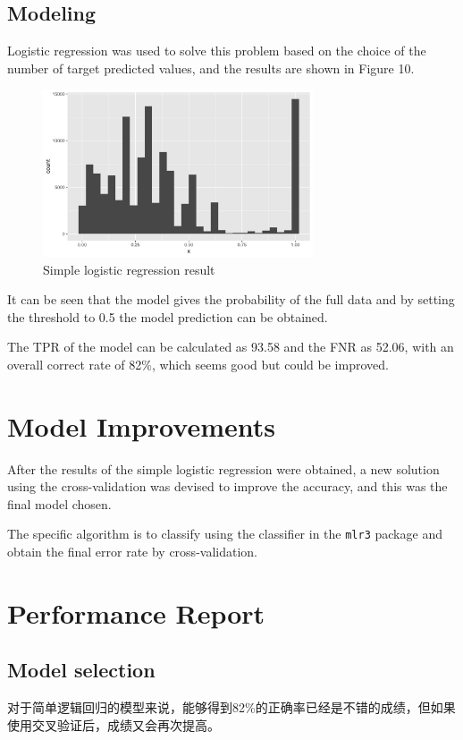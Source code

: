 \documentclass{article}
\begin{document}
\subsection{Modeling}

Logistic regression was used to solve this problem based on the choice of the number of target predicted values, and the results are shown in Figure 10.

\begin{figure}[h]
\centering
\includegraphics[width=8cm]{lrresult.png} %
\caption{Simple logistic regression result} %
\end{figure}

It can be seen that the model gives the probability of the full data and by setting the threshold to 0.5 the model prediction can be obtained.

The TPR of the model can be calculated as 93.58 and the FNR as 52.06, with an overall correct rate of 82\%, which seems good but could be improved.


\section{Model Improvements}

After the results of the simple logistic regression were obtained, a new solution using the cross-validation was devised to improve the accuracy, and this was the final model chosen. 

The specific algorithm is to classify using the classifier in the \verb|mlr3| package and obtain the final error rate by cross-validation.


\section{Performance Report}

\subsection{Model selection}
对于简单逻辑回归的模型来说，能够得到82\%的正确率已经是不错的成绩，但如果使用交叉验证后，成绩又会再次提高。
\end{document}
